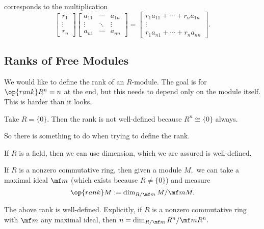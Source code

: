 corresponds to the multiplication
\[\begin{bmatrix}
	r_1 \\ \vdots \\ r_n
\end{bmatrix}\begin{bmatrix}
	a_{11} & \cdots & a_{1n} \\
	\vdots & \ddots & \vdots \\
	a_{n1} & \cdots & a_{nn}
\end{bmatrix}=\begin{bmatrix}
	r_1a_{11} + \cdots + r_na_{1n} \\
	\vdots \\
	r_1a_{n1} + \cdots + r_na_{nn}
\end{bmatrix}.\]

\subsection{Ranks of Free Modules}
We would like to define the rank of an $R$-module. The goal is for $\op{rank}R^n=n$ at the end, but this needs to depend only on the module itself. This is harder than it looks.
\begin{nex}
	Take $R=\{0\}.$ Then the rank is not well-defined because $R^n\cong\{0\}$ always.
\end{nex}
So there is something to do when trying to define the rank.
\begin{example}
	If $R$ is a field, then we can use dimension, which we are assured is well-defined.
\end{example}
\begin{example}
	If $R$ is a nonzero commutative ring, then given a module $M,$ we can take a maximal ideal $\mf m$ (which exists because $R\ne\{0\}$) and measure
	\[\op{rank}M:=\dim_{R/\mf m}M/\mf mM.\]
\end{example}
\begin{proposition}
	The above rank is well-defined. Explicitly, if $R$ is a nonzero commutative ring with $\mf m$ any maximal ideal, then $n=\dim_{R/\mf m}R^n/\mf mR^n.$
\end{proposition}
